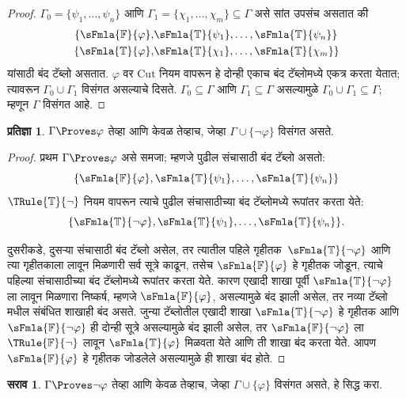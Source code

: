 \documentclass[11pt,a4paper,openany]{book}
\theoremstyle{definition}
\newtheorem{prop}[defn]{प्रतिज्ञा}
\newtheorem{prob}{सराव}[chapter]
\newcommand{\True}{\ensuremath{\mathbb{T}}}
\newcommand{\False}{\ensuremath{\mathbb{F}}}
\newcommand{\Cut}{\ensuremath{\mathrm{Cut}}}
\begin{document}
\begin{proof}
$\Gamma_0 = \{\psi_1, \dots, \psi_n\}$ आणि $\Gamma_1
  =\{\chi_1, \dots, \chi_m\} \subseteq \Gamma$ असे सांत उपसंच असतात की
  \begin{align*}
    \{\sFmla{\False}{\varphi}, &
    \sFmla{\True}{\psi_1}, \dots, \sFmla{\True}{\psi_n}\} \\
    \{\sFmla{\True}{\varphi}, &
    \sFmla{\True}{\chi_1}, \dots, \sFmla{\True}{\chi_m}\}
  \end{align*}
  यांसाठी बंद टॅब्लो असतात. $\varphi$ वर \Cut{} नियम वापरून हे दोन्ही
  एकाच बंद टॅब्लोमध्ये एकत्र करता येतात; त्यावरून $\Gamma_0
  \cup \Gamma_1$ विसंगत असल्याचे दिसते. $\Gamma_0
  \subseteq \Gamma$ आणि $\Gamma_1 \subseteq \Gamma$ असल्यामुळे $\Gamma_0 \cup
  \Gamma_1 \subseteq \Gamma$; म्हणून $\Gamma$ विसंगत आहे.
\end{proof}

\begin{prop}
\label{fol:tab:prv:prop:prov-incons}
$\Gamma \Proves \varphi$ तेव्हा आणि केवळ तेव्हाच, जेव्हा $\Gamma \cup \{\lnot \varphi\}$
विसंगत असते.
\end{prop}

\begin{proof}
प्रथम $\Gamma \Proves \varphi$ असे समजा; म्हणजे पुढील संचासाठी बंद
टॅब्लो असतो:
\[
\{\sFmla{\False}{\varphi},
\sFmla{\True}{\psi_1}, \dots, \sFmla{\True}{\psi_n}\}
\]
$\TRule{\True}{\lnot}$ नियम वापरून त्याचे पुढील संचासाठीच्या बंद
टॅब्लोमध्ये रूपांतर करता येते:
\[
\{\sFmla{\True}{\lnot \varphi},
\sFmla{\True}{\psi_1}, \dots, \sFmla{\True}{\psi_n}\}.
\]

दुसरीकडे, दुसऱ्या संचासाठी बंद टॅब्लो असेल, तर त्यातील पहिले
गृहीतक~$\sFmla{\True}{\lnot \varphi}$ आणि त्या गृहीतकाला
\TRule{\True}{\lnot} लावून मिळणारी सर्व सूत्रे काढून, तसेच
$\sFmla{\False}{\varphi}$ हे गृहीतक जोडून, त्याचे पहिल्या संचासाठीच्या बंद
टॅब्लोमध्ये रूपांतर करता येते. कारण एखादी शाखा पूर्वी
$\sFmla{\True}{\lnot \varphi}$ ला \TRule{\True}{\lnot} लावून मिळणारा
निष्कर्ष, म्हणजे $\sFmla{\False}{\varphi}$, असल्यामुळे बंद झाली असेल, तर नव्या
टॅब्लो मधील संबंधित शाखाही बंद असते. जुन्या टॅब्लोतील एखादी शाखा
$\sFmla{\True}{\lnot \varphi}$ हे गृहीतक आणि $\sFmla{\False}{\lnot \varphi}$
ही दोन्ही सूत्रे असल्यामुळे बंद झाली असेल, तर $\sFmla{\False}{\lnot \varphi}$
ला $\TRule{\False}{\lnot}$ लावून $\sFmla{\True}{\varphi}$ मिळवता येते आणि
ती शाखा बंद करता येते. आपण $\sFmla{\False}{\varphi}$ हे गृहीतक जोडलेले
असल्यामुळे ही शाखा बंद होते.
\end{proof}

\begin{prob}
$\Gamma \Proves \lnot \varphi$ तेव्हा आणि केवळ तेव्हाच, जेव्हा $\Gamma \cup \{\varphi\}$
विसंगत असते, हे सिद्ध करा.
\end{prob}
\end{document}
